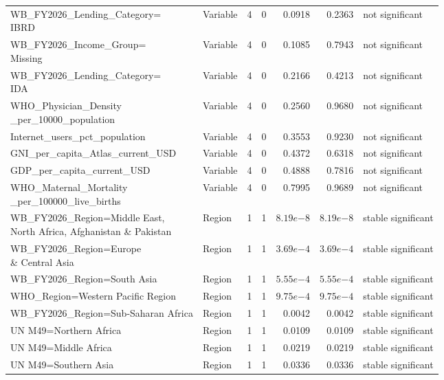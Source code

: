 \documentclass[runningheads]{llncs}
\begin{document}
{\begin{longtable}{p{}p{}rr@{\hspace{0.7em}}rrp{}}
\shortstack[l]{WB\_FY2026\_Lending\_Category=\\ IBRD} & Variable & 4 & 0 & 0.0918 & 0.2363 & not significant \\
\shortstack[l]{WB\_FY2026\_Income\_Group=\\ Missing} & Variable & 4 & 0 & 0.1085 & 0.7943 & not significant \\
\shortstack[l]{WB\_FY2026\_Lending\_Category=\\ IDA} & Variable & 4 & 0 & 0.2166 & 0.4213 & not significant \\
\shortstack[l]{WHO\_Physician\_Density\\ \_per\_10000\_population} & Variable & 4 & 0 & 0.2560 & 0.9680 & not significant \\
Internet\_users\_pct\_population & Variable & 4 & 0 & 0.3553 & 0.9230 & not significant \\
GNI\_per\_capita\_Atlas\_current\_USD & Variable & 4 & 0 & 0.4372 & 0.6318 & not significant \\
GDP\_per\_capita\_current\_USD & Variable & 4 & 0 & 0.4888 & 0.7816 & not significant \\
\shortstack[l]{WHO\_Maternal\_Mortality\\ \_per\_100000\_live\_births} & Variable & 4 & 0 & 0.7995 & 0.9689 & not significant \\
\shortstack[l]{WB\_FY2026\_Region=Middle East,\\ North Africa, Afghanistan \& Pakistan} & Region & 1 & 1 & $8.19e{-8}$ & $8.19e{-8}$ & stable significant \\
\shortstack[l]{WB\_FY2026\_Region=Europe\\ \& Central Asia} & Region & 1 & 1 & $3.69e{-4}$ & $3.69e{-4}$ & stable significant \\
WB\_FY2026\_Region=South Asia & Region & 1 & 1 & $5.55e{-4}$ & $5.55e{-4}$ & stable significant \\
WHO\_Region=Western Pacific Region & Region & 1 & 1 & $9.75e{-4}$ & $9.75e{-4}$ & stable significant \\
WB\_FY2026\_Region=Sub-Saharan Africa & Region & 1 & 1 & 0.0042 & 0.0042 & stable significant \\
UN M49=Northern Africa & Region & 1 & 1 & 0.0109 & 0.0109 & stable significant \\
UN M49=Middle Africa & Region & 1 & 1 & 0.0219 & 0.0219 & stable significant \\
UN M49=Southern Asia & Region & 1 & 1 & 0.0336 & 0.0336 & stable significant \\

\end{longtable}}
\end{document}
